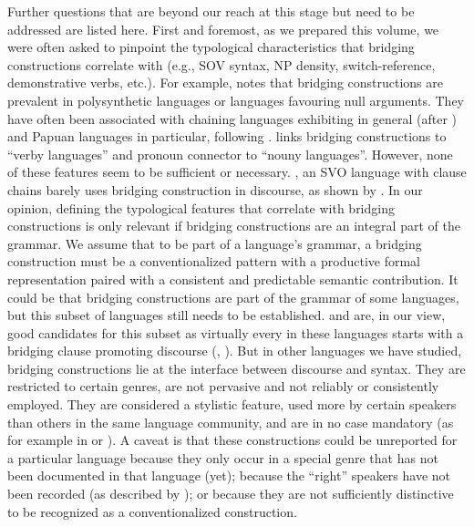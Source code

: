 \documentclass[output=paper]{LSP/langsci}
\begin{document}
Further questions that are beyond our reach at this stage but need to be addressed are listed here. First and foremost, as we prepared this volume, we were often asked to pinpoint the typological characteristics that bridging constructions correlate with (e.g., SOV syntax, NP density, switch-reference, demonstrative verbs, etc.). For example, \citet[][113]{Guillaume2011} notes that bridging constructions are prevalent in polysynthetic languages or languages favouring null arguments. They have often been associated with chaining languages exhibiting  in general (after \citealt{stirling93}) and Papuan languages in particular, following \citealt{devries.2005}. \citet{seifart10} links bridging constructions to ``verby languages'' and pronoun connector to ``nouny languages''.  However, none of these features seem to be sufficient or necessary. , an SVO  language with clause chains barely uses bridging construction in discourse, as shown by . In our opinion, defining the typological features that correlate with bridging constructions is only relevant if bridging constructions are an integral part of the grammar. We assume that to be part of a language’s grammar, a bridging construction must be a conventionalized pattern with a productive formal representation paired with a consistent and predictable semantic contribution.  It could be that bridging constructions are part of the grammar of some languages, but this subset of languages still needs to be established.  and  are, in our view, good candidates for this subset as virtually every  in these languages starts with a bridging clause promoting discourse  (\citealt[][152]{kleef88}, \citealt[][589]{overall17}). But in other languages we have studied, bridging constructions lie at the interface between discourse and syntax. They are restricted to certain genres, are not pervasive and not reliably or consistently employed. They are considered a stylistic feature, used more by certain speakers than others in the same language community, and are in no case mandatory (as for example in  or ). A caveat is that these constructions could be unreported for a particular language because they only occur in a special genre that has not been documented in that language (yet); because the ``right'' speakers have not been recorded (as described by \citealt{Grenoble2012}); or because they are not sufficiently distinctive to be recognized as a conventionalized construction.
\end{document}
